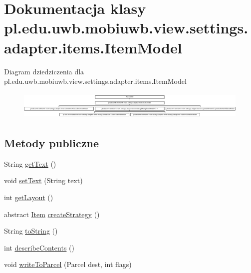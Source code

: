 \hypertarget{classpl_1_1edu_1_1uwb_1_1mobiuwb_1_1view_1_1settings_1_1adapter_1_1items_1_1_item_model}{}\section{Dokumentacja klasy pl.\+edu.\+uwb.\+mobiuwb.\+view.\+settings.\+adapter.\+items.\+Item\+Model}
\label{classpl_1_1edu_1_1uwb_1_1mobiuwb_1_1view_1_1settings_1_1adapter_1_1items_1_1_item_model}
Diagram dziedziczenia dla pl.\+edu.\+uwb.\+mobiuwb.\+view.\+settings.\+adapter.\+items.\+Item\+Model\begin{figure}[H]
\begin{center}
\leavevmode
\includegraphics[height=1.357576cm]{classpl_1_1edu_1_1uwb_1_1mobiuwb_1_1view_1_1settings_1_1adapter_1_1items_1_1_item_model}
\end{center}
\end{figure}
\subsection*{Metody publiczne}
\begin{DoxyCompactItemize}
\item 
String \hyperlink{classpl_1_1edu_1_1uwb_1_1mobiuwb_1_1view_1_1settings_1_1adapter_1_1items_1_1_item_model_af12d5aab537e1374ad9b2b320db9260a}{get\+Text} ()
\item 
void \hyperlink{classpl_1_1edu_1_1uwb_1_1mobiuwb_1_1view_1_1settings_1_1adapter_1_1items_1_1_item_model_a16ae1d0966b49e52b9e716b1a5e2c142}{set\+Text} (String text)
\item 
int \hyperlink{classpl_1_1edu_1_1uwb_1_1mobiuwb_1_1view_1_1settings_1_1adapter_1_1items_1_1_item_model_aecb8aae3b59000eec4eb8e9788d7c7f5}{get\+Layout} ()
\item 
abstract \hyperlink{classpl_1_1edu_1_1uwb_1_1mobiuwb_1_1view_1_1settings_1_1adapter_1_1items_1_1_item}{Item} \hyperlink{classpl_1_1edu_1_1uwb_1_1mobiuwb_1_1view_1_1settings_1_1adapter_1_1items_1_1_item_model_a8306909bc6526e3c9022b405c161d37c}{create\+Strategy} ()
\item 
String \hyperlink{classpl_1_1edu_1_1uwb_1_1mobiuwb_1_1view_1_1settings_1_1adapter_1_1items_1_1_item_model_a6f143a975e355661f177704b3cad6b6f}{to\+String} ()
\item 
int \hyperlink{classpl_1_1edu_1_1uwb_1_1mobiuwb_1_1view_1_1settings_1_1adapter_1_1items_1_1_item_model_afbacfc3a74493db33347e0105d8eacdd}{describe\+Contents} ()
\item 
void \hyperlink{classpl_1_1edu_1_1uwb_1_1mobiuwb_1_1view_1_1settings_1_1adapter_1_1items_1_1_item_model_ad11f99642527a1ce6d386099a0174076}{write\+To\+Parcel} (Parcel dest, int flags)
\end{DoxyCompactItemize}
